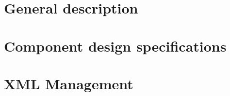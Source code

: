 \documentclass[a4paper,twoside,openright,makeidx,12pt]{book}
\begin{document}
\pagestyle{empty}
\renewcommand{\arraystretch}{1.8}



\tableofcontents


\pagestyle{fancy}
\clearpage

\newpage
{}
\chapter{General description}
\label{Sec:DDD-GeneralDescription}


%


%


\newpage
\chapter{Component design specifications}
\label{Sec:DDD-ComponentDesignSpecifications}

\newpage
\chapter{XML Management}
\label{Sec:DDD-XMLManagement}

\newpage
\end{document}

